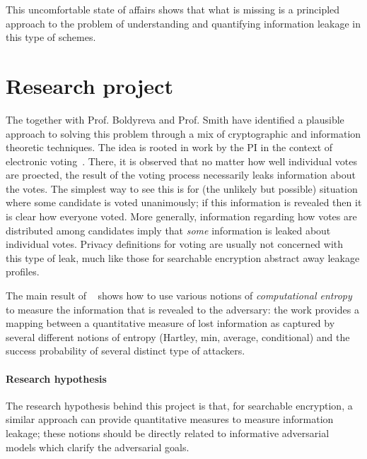 This uncomfortable state of affairs shows that what is missing is a principled approach to the problem of understanding and quantifying information leakage in this type of schemes. 

\newpage

\section{Research project}
\label{sec:prop_hyp}

The \PI together with Prof. Boldyreva and Prof. Smith have identified a plausible approach to solving this problem through a mix of cryptographic and information theoretic techniques. 
The idea is rooted in work by the PI in the context of electronic voting~\cite{bernhard2012measuring}. 
There, it is observed that no matter how well individual votes are proected, the result of the voting process necessarily leaks information about the votes.
The simplest way to see this is for (the unlikely but possible) situation where some candidate is voted unanimously; if this information is revealed then it is clear how everyone voted.  More generally, information regarding how votes are distributed among candidates imply that \emph{some} information is leaked about individual votes.  Privacy definitions for voting are usually not concerned with this type of leak, much like those for searchable encryption abstract away leakage profiles. 

The main result of ~\cite{bernhard2012measuring} shows how to use various notions of \emph{computational entropy} to measure the information that is revealed to the adversary: the work provides a mapping between a quantitative measure of lost information as captured by several different notions of entropy (Hartley, min, average, conditional) and the success probability of several distinct type of attackers. 

\paragraph{Research hypothesis}
The research hypothesis behind this project is that, for searchable encryption,  a similar approach can provide quantitative measures to measure information leakage; these notions should be directly related to informative adversarial models which clarify the adversarial goals. 

